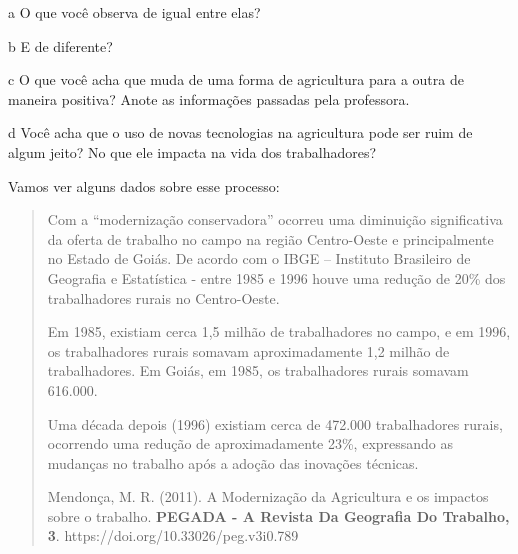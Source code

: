 \num{a} O que você observa de igual entre elas?


\num{b} E de diferente?


\num{c} O que você acha que muda de uma forma de agricultura para a outra de
maneira positiva? Anote as informações passadas pela professora. 



\num{d} Você acha que o uso de novas tecnologias na agricultura pode ser ruim de
algum jeito? No que ele impacta na vida dos trabalhadores?


Vamos ver alguns dados sobre esse processo:

\begin{quote}
Com a ``modernização conservadora'' ocorreu uma diminuição significativa
da oferta de trabalho no campo na região Centro-Oeste e principalmente
no Estado de Goiás. De acordo com o IBGE -- Instituto Brasileiro de
Geografia e Estatística - entre 1985 e 1996 houve uma redução de 20\%
dos trabalhadores rurais no Centro-Oeste.

Em 1985, existiam cerca 1,5 milhão de trabalhadores no campo, e em 1996,
os trabalhadores rurais somavam aproximadamente 1,2 milhão de
trabalhadores. Em Goiás, em 1985, os trabalhadores rurais somavam
616.000.

Uma década depois (1996) existiam cerca de 472.000 trabalhadores rurais,
ocorrendo uma redução de aproximadamente 23\%, expressando as mudanças
no trabalho após a adoção das inovações técnicas.

Mendonça, M. R. (2011). A Modernização da Agricultura e os impactos
sobre o trabalho. \textbf{PEGADA - A Revista Da Geografia Do Trabalho,
3}. https://doi.org/10.33026/peg.v3i0.789
\end{quote}


